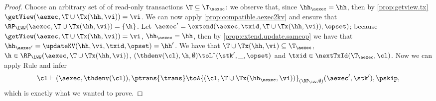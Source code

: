 \begin{proof}
Choose an arbitrary set of of read-only transactions $\T \subseteq \T_{\aexec}$: 
we observe that, since $\hh_{\aexec} = \hh$, then  by \cref{prop:getview.tx} $\getView(\aexec, \T \cup \Tx(\hh, \vi)) = \vi$. 
We can now apply \cref{prop:compatible.aexec2kv} and ensure that $\RP_{\LWW}(\aexec, \T \cup \Tx(\hh, \vi)) = \{\h\}$.
Let $\aexec' = \extend(\aexec, \txid, \T \cup \Tx(\hh, \vi)), \opset)$; because $\getView(\aexec, \T \cup \Tx(\hh, \vi)) = \vi$, 
$\hh_{\aexec} = \hh$,
then by \cref{prop:extend.update.sameop} we have that $\hh_{\aexec'} = \updateKV(\hh, \vi, \txid, \opset) = \hh'$. 
We  have that $\T \cup \Tx(\hh, \vi) \subseteq \T_{\aexec}$, $\h \in \RP_{\LWW}(\aexec, \T \cup \Tx(\hh, \vi))$,
$(\thdenv(\cl), \h, \emptyset) \toL^{\ast} (\stk', \_, \opset)$ and $\txid \in \nextTxId(\T_{\aexec}, \cl)$. 
Now we can apply Rule  and infer
\[
\cl \vdash (\aexec, \thdenv(\cl)), \ptrans{\trans} \toA{(\cl, \T \cup \Tx(\hh_{\aexec}, \vi))}_{(\RP_{\LWW}, \emptyset)} 
(\aexec', \stk'), \pskip,
\]
which is exactly what we wanted to prove. 
\end{proof}


